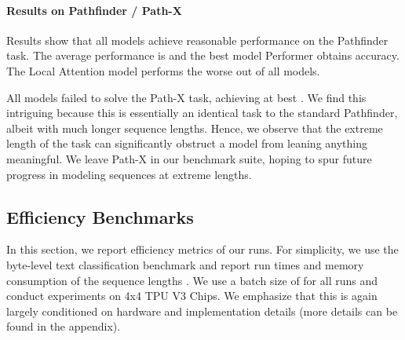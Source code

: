 \documentclass{article} \usepackage{iclr2021_conference,times}
\begin{document}
\paragraph{Results on Pathfinder / Path-X} Results show that all models achieve reasonable performance on the Pathfinder task. The average performance is  and the best model Performer obtains  accuracy. The Local Attention model performs the worse out of all models.

All models failed to solve the Path-X task, achieving at best . We find this intriguing because this is essentially an identical task to the standard Pathfinder, albeit with much longer sequence lengths. Hence, we observe that the extreme length of the task can significantly obstruct a model from leaning anything meaningful. We leave Path-X in our benchmark suite, hoping to spur future progress in modeling sequences at extreme lengths. 

\subsection{Efficiency Benchmarks}
In this section, we report efficiency metrics of our runs. For simplicity, we use the byte-level text classification benchmark and report run times and memory consumption of the sequence lengths . We use a batch size of  for all runs and conduct experiments on 4x4 TPU V3 Chips. We emphasize that this is again largely conditioned on hardware and implementation details (more details can be found in the appendix).
\end{document}
